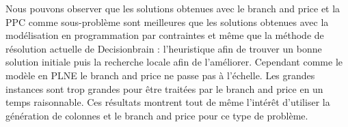 Nous pouvons observer que les solutions obtenues avec le branch and price et la PPC comme sous-problème sont meilleures que les solutions obtenues avec la modélisation en programmation par contraintes et même que la méthode de résolution actuelle de Decisionbrain : l'heuristique afin de trouver un bonne solution initiale puis la recherche locale afin de l'améliorer.
Cependant comme le modèle en PLNE le branch and price ne passe pas à l'échelle.
Les grandes instances sont trop grandes pour être traitées par le branch and price en un temps raisonnable.
Ces résultats montrent tout de même l'intérêt d'utiliser la génération de colonnes et le branch and price pour ce type de problème.





\begin{comment}


 \begin{table}
[H]
\centering
\scriptsize
 \begin{tabular}
 {|l|l|l|l|l|l|l|l|l|}
 \hline
 Instance & Modèle & Obj. & CPU(s) & Status & \#n\oe uds & \#n\oe uds   & \#colonnes  & gap\\
 & & & & & parcourus & restants  &  & \\
 \hline
instance\#3\#15 & BP & 12770.0 & 2.0 & Optimal & 3 & 0  & 18 & 0\%\\
instance\#3\#15 & Heuristique+BP & 12770.0	& 7.0 & Optimal & 13 & 0 & 66 & 0\%\\
instance\#30\#256 & BP & 7025680.0 & 605.0 & Réalisable & 32 & 9 & 592 & 234\%\\
instance\#30\#256 & Heuristique+BP & 2.1475E7 & 655.0 & Réalisable & 23 & 14 & 475 & 9.5\%\\
instance\#30\#305 & BP & 3007775.0 & 613.0 & Réalisable & 24 & 9 & 438 &409\%\\
instance\#30\#305 & Heuristique+BP & 1.1269E7 & 601.0 & Réalisable & 18 & 9 & 387 & 35\%\\

 \hline
instance\#3\#15 & BP & 12770.0 & 14.0 & Optimal & 23 & 0 & 74 & 0\%\\
instance\#3\#15 & Heuristique+BP & 12770.0	& 17.0 & Optimal & 17 & 0 & 81 & 0\%\\
instance\#30\#256 & BP & 8187290.0 & 1802.0 & Réalisable & 61 & 23 & 829 & 187\%\\
instance\#30\#256 & Heuristique+BP & 2.1475E7 & 1805.0 & Réalisable & 52 & 12 & 643 & 9.5\%\\
instance\#30\#305 & BP & 3928718.0 & 1810.0 & Réalisable & 64 & 14 & 712 & 239\% \\
instance\#30\#305 & Heuristique+BP & 1.1269E7 & 1808.0 & Réalisable & 48 & 9 & 616 & 35\% \\
 \hline
 \end{tabular}
 \caption{Résultats pour le branch and price sur les instances de moyenne taille avec une limite de temps de résolution de 10 et 30 minutes en utilisant la programmation linéaire en nombres entiers pour le sous-problème.\label{table:res_BP_IP}}
\end{table}
\end{comment}


